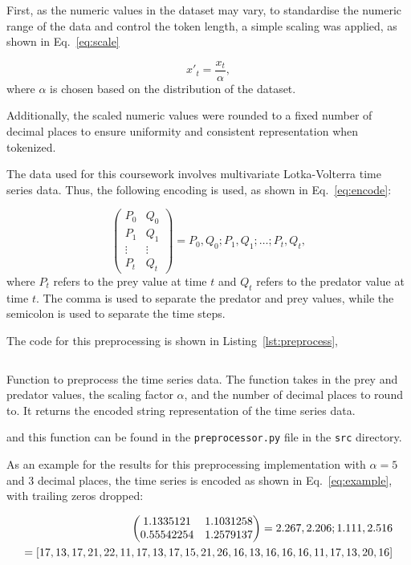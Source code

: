\documentclass[11pt,a4paper]{article}
\begin{document}
First, as the numeric values in the dataset may vary, to standardise the numeric range of the data and control the token length, a simple scaling was applied, as shown in Eq.~\ref{eq:scale}

\begin{equation}
    x'_t = \frac{x_t}{\alpha},
\end{equation}
where $\alpha$ is chosen based on the distribution of the dataset.

Additionally, the scaled numeric values were rounded to a fixed number of decimal places to ensure uniformity and consistent representation when tokenized.

The data used for this coursework involves multivariate Lotka-Volterra time series data. Thus, the following encoding is used, as shown in Eq.~\ref{eq:encode}:

\begin{equation}
    \begin{pmatrix}
        P_0 & Q_0 \\
        P_1 & Q_1 \\
        \vdots & \vdots \\
        P_t & Q_t 
        \end{pmatrix}  
        = P_0,Q_0;P_{1},Q_{1};\ldots;P_{t},Q_{t},
    \label{eq:encode}
\end{equation}
where $P_t$ refers to the prey value at time $t$ and $Q_t$ refers to the predator value at time $t$. The comma is used to separate the predator and prey values, while the semicolon is used to separate the time steps.

The code for this preprocessing is shown in Listing~\ref{lst:preprocess},
\begin{listing}[h]
\inputminted[firstline=64, lastline=83]{python}{../src/preprocessor.py}
\caption{Function to preprocess the time series data. The function takes in the prey and predator values, the scaling factor $\alpha$, and the number of decimal places to round to. It returns the encoded string representation of the time series data.}
\label{lst:preprocess}
\end{listing}
and this function can be found in the \texttt{preprocessor.py} file in the \texttt{src} directory.

As an example for the results for this preprocessing implementation with $\alpha = 5$ and 3 decimal places, the time series is encoded as shown in Eq.~\ref{eq:example}, with trailing zeros dropped:

\begin{equation}
\raggedleft
\begin{split}
\begin{pmatrix}
1.1335121  & 1.1031258 \\
0.55542254  & 1.2579137
\end{pmatrix}
= 2.267,2.206;1.111,2.516
\\ 
= [17, 13, 17, 21, 22, 11, 17, 13, 17, 15, 21, 26, 16, 13, 16, 16, 16, 11, 17, 13, 20, 16]
\end{split}
\label{eq:example}
\end{equation}
\end{document}
